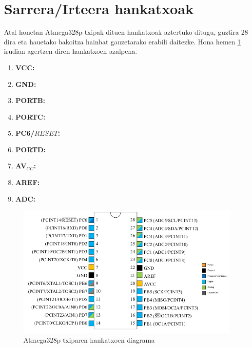 \section{Sarrera/Irteera hankatxoak}

Atal honetan Atmega328p txipak dituen hankatxoak aztertuko ditugu, guztira 28 dira eta hauetako bakoitza hainbat gauzetarako erabili daitezke. Hona hemen \ref{fig:pinout} irudian agertzen diren hankatxoen azalpena.

\begin{enumerate}
    \item \textbf{VCC: }
    \item \textbf{GND:}
    \item \textbf{PORTB:}
    \item \textbf{PORTC:}
    \item \textbf{PC6/$\overline{RESET}$:}
    \item \textbf{PORTD:}
    \item \textbf{AV$_{CC}$:}
    \item \textbf{AREF:}
    \item \textbf{ADC:}
\end{enumerate}

\newpage
\begin{figure}[htb]
	\centering
	\includegraphics[width=.8\linewidth]{images/pinak.png}
	\caption{\label{fig:pinout} Atmega328p txiparen hankatxoen diagrama}
\end{figure}
